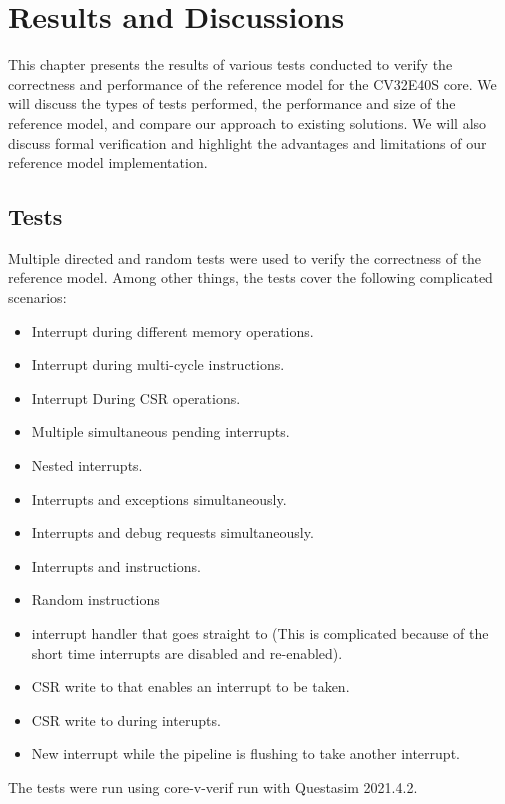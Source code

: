 \chapter{Results and Discussions}
\label{ch:results}
 
This chapter presents the results of various tests conducted to verify the correctness and performance of the reference model for the CV32E40S core. We will discuss the types of tests performed, the performance and size of the reference model, and compare our approach to existing solutions. We will also discuss formal verification and highlight the advantages and limitations of our reference model implementation.

\section{Tests}
\label{sec:res_tests}

Multiple directed and random tests were used to verify the correctness of the reference model. Among other things, the tests cover the following complicated scenarios: 
\begin{itemize}
    \item Interrupt during different memory operations.
    \item Interrupt during multi-cycle instructions.
    \item Interrupt During CSR operations.
    \item Multiple simultaneous pending interrupts.
    \item Nested interrupts.
    \item Interrupts and exceptions simultaneously.
    \item Interrupts and debug requests simultaneously.
    \item Interrupts and  instructions.
    \item Random instructions
    \item interrupt handler that goes straight to  (This is complicated because of the short time interrupts are disabled and re-enabled).
    \item CSR write to  that enables an interrupt to be taken.
    \item CSR write to  during interupts.
    \item New interrupt while the pipeline is flushing to take another interrupt.
\end{itemize}

The tests were run using core-v-verif run with Questasim 2021.4.2. 


